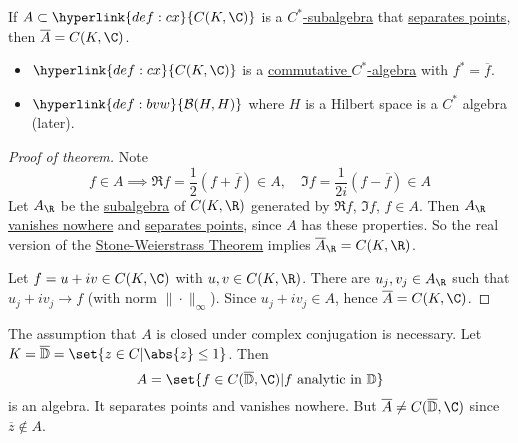 \documentclass{article}
\begin{document}

\begin{cor}
    If $A \subset \hyperlink{def:cx}{C(K, \C)}$ is a \hyperlink{def:cstar}{$C^*$-subalgebra} that \hyperlink{def:sep}{separates points}, then $\overline{A} = C(K, \C)$.
\end{cor}

\begin{eg}
    \leavevmode
    \begin{itemize}
        \item $\hyperlink{def:cx}{C(K, \C)}$ is a \hyperlink{def:cstar}{commutative $C^*$-algebra} with $f^* = \overline{f}$.
        \item $\hyperlink{def:bvw}{\mathcal{B}(H, H)}$ where $H$ is a Hilbert space is a $C^*$ algebra (later).
    \end{itemize}
\end{eg}

\begin{proof}[Proof of theorem]
    Note
    \begin{equation*}
        f \in A \implies \Re f = \frac{1}{2} (f + \overline{f}) \in A, \quad \Im f = \frac{1}{2i}(f - \overline{f}) \in A
    \end{equation*}
    Let $A_\R$ be the \hyperlink{def:alg}{subalgebra} of $C(K, \R)$ generated by $\Re f$, $\Im f$, $f \in A$.
    Then $A_\R$ \hyperlink{def:vanish}{vanishes nowhere} and \hyperlink{def:sep}{separates points}, since $A$ has these properties.
    So the real version of the \hyperlink{thm:sw}{Stone-Weierstrass Theorem} implies $\overline{A}_\R = C(K, \R)$.

    Let $f = u + i v \in C(K, \C)$ with $u, v \in C(K, \R)$. There are $u_j, v_j \in A_\R$ such that $u_j + i v_j \to f$ (with norm $\|\cdot\|_\infty$).
    Since $u_j + i v_j \in A$, hence $\overline{A} = C(K, \C)$.
\end{proof}

\begin{eg}
    The assumption that $A$ is closed under complex conjugation is necessary.
    Let $K = \overline{\mathbb{D}} = \set{z \in C | \abs{z} \leq 1}$.
    Then
    \begin{equation*}
        A = \set{f \in C(\overline{\mathbb{D}}, \C) | f \text{ analytic in } \mathbb{D}}
    \end{equation*}
    is an algebra.
    It separates points and vanishes nowhere. But $\overline{A} \neq C(\overline{\mathbb{D}}, \C)$ since $\overline{z} \notin A$.
\end{eg}
\end{document}
